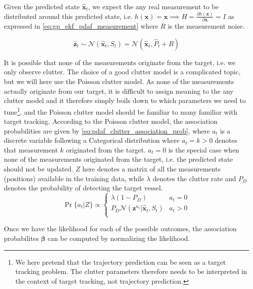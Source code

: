 Given the predicted state $\hat{\boldsymbol{x}}_t$, we expect the any real measurement to be distributed around this predicted state, i.e. $h(\boldsymbol{x}) = \boldsymbol{x} \implies H = \frac{\partial h (\boldsymbol{x})}{\partial \boldsymbol{x}} = I$ as expressed in \cref{eq:gp_ekf_pdaf_measurement} where $R$ is the measurement noise.

\begin{equation} \label{eq:gp_ekf_pdaf_measurement}
    \hat{\boldsymbol{z}}_t \sim \mathcal{N}(\hat{\boldsymbol{x}}_t, S_{t}) = \mathcal{N}(\hat{\boldsymbol{x}}_t, \hat{P}_t + R)
\end{equation}

It is possible that none of the measurements originate from the target, i.e. we only observe clutter. The choice of a good clutter model is a complicated topic, but we will here use the Poisson clutter model. As none of the measurements actually originate from our target, it is difficult to assign meaning to the any clutter model and it therefore simply boils down to which parameters we need to tune\footnote{We here pretend that the trajectory prediction can be seen as a target tracking problem. The clutter parameters therefore needs to be interpreted in the context of target tracking, not trajectory prediction.}, and the Poisson clutter model should be familiar to many familiar with target tracking.
According to the Poisson clutter model, the association probabilities are given by \cref{eq:pdaf_clutter_association_prob}, where $a_t$ is a discrete variable following a Categorical distribution where $a_t=k > 0$ denotes that measurement $k$ originated from the target. $a_t = 0$ is the special case when none of the measurements originated from the target, i.e. the predicted state should not be updated. $Z$ here denotes a matrix of all the measurements (positions) available in the training data, while $\lambda$ denotes the clutter rate and $P_D$ denotes the probability of detecting the target vessel.
\begin{equation}\label{eq:pdaf_clutter_association_prob}
    \Pr\{a_t | Z\} \propto \begin{cases}
        \lambda (1 - P_D) &  a_t = 0\\
        P_D \mathcal{N} (\boldsymbol{z}^{a_t} | \hat{\boldsymbol{x}}_t, S_t) & a_t > 0\\
    \end{cases}
\end{equation}

Once we have the likelihood for each of the possible outcomes, the association probabilites $\boldsymbol{\beta}$ can be computed by normalizing the likelihood. 

